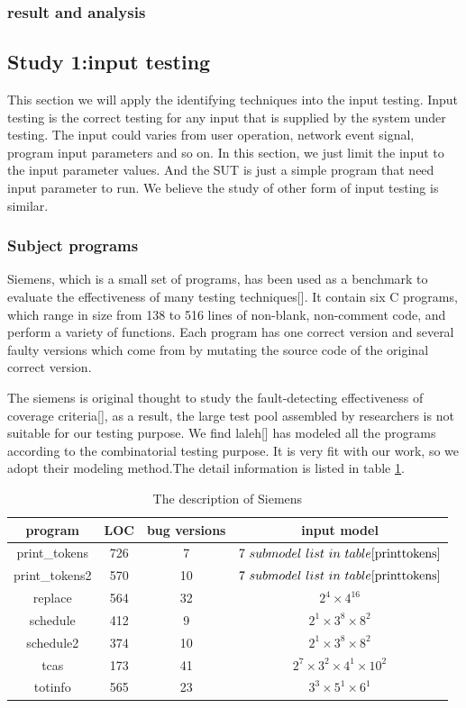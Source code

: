 \documentclass[10pt,journal,cspaper,compsoc]{IEEEtran}
\begin{document}
 \subsubsection{result and analysis}

\subsection{Study 1:input testing}
This section we will apply the identifying techniques into the input testing. Input testing is the correct testing for any input that is supplied by the system under testing. The input could varies from user operation, network event signal, program input parameters and so on. In this section, we just limit the input to the input parameter values. And the SUT is just a simple program that need input parameter to run. We believe the study of other form of input testing is similar.

\subsubsection{Subject programs}
Siemens, which is a small set of programs, has been used as a benchmark to evaluate the effectiveness of many testing techniques[]. It contain six C programs, which range in size from 138 to 516 lines of non-blank, non-comment code, and perform a variety of functions. Each program has one correct version and several faulty versions which come from by mutating the source code of the original correct version.

The siemens is original thought to study the fault-detecting effectiveness of coverage criteria[], as a result, the large test pool assembled by researchers is not suitable for our testing purpose. We find laleh[] has modeled all the programs according to the combinatorial testing purpose. It is very fit with our work, so we adopt their modeling method.The detail information is listed in table \ref{Siemens}.
\begin{table}\renewcommand{\arraystretch}{1.3}
  \caption{The description of Siemens} \centering
  \label{Siemens}
  \begin{tabular}{c|c|c|c}\hline
  \hline
  \bfseries program &  \bfseries LOC & \bfseries bug versions & \bfseries input model\\
  \hline
   print\_tokens & 726 & 7 & $7\ submodel\ list\ in\ table\ref{printtokens} $\\
   print\_tokens2 & 570 & 10 & $7\ submodel\ list\ in\ table\ref{printtokens}$\\
   replace & 564 & 32 & $2^{4}\times4^{16}$\\
   schedule & 412 & 9 & $2^{1}\times3^{8}\times8^{2}$\\
   schedule2 & 374 & 10 & $2^{1}\times3^{8}\times8^{2}$\\
   tcas & 173 & 41 & $2^{7}\times3^{2}\times4^{1}\times10^{2}$\\
   totinfo & 565 & 23 & $3^{3}\times5^{1}\times6^{1}$\\
  \hline
  \end{tabular}

\end{table}
\end{document}
